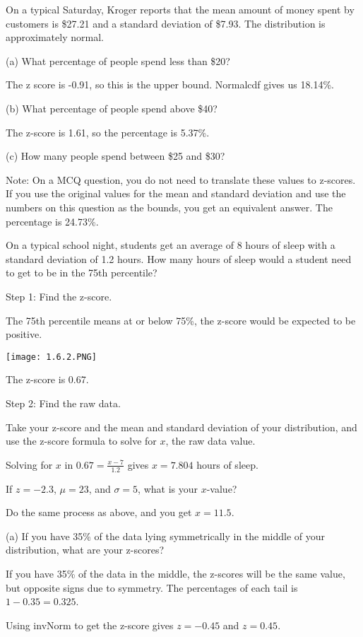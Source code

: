 \documentclass[../stats.tex]{subfiles}
\begin{document}
\begin{example}
    On a typical Saturday, Kroger reports that the mean amount of money spent by customers is \$27.21 and a standard deviation of \$7.93. The distribution is approximately normal.

    (a) What percentage of people spend less than \$20?

    The z score is -0.91, so this is the upper bound. Normalcdf gives us 18.14\%.

    (b) What percentage of people spend above \$40?

    The z-score is 1.61, so the percentage is 5.37\%.

    (c) How many people spend between \$25 and \$30?

    Note: On a MCQ question, you do not need to translate these values to z-scores. If you use the original values for the mean and standard deviation and use the numbers on this question as the bounds, you get an equivalent answer. The percentage is 24.73\%.
\end{example}

\begin{example}
    On a typical school night, students get an average of 8 hours of sleep with a standard deviation of 1.2 hours. How many hours of sleep would a student need to get to be in the 75th percentile?

    Step 1: Find the z-score.

    The 75th percentile means at or below 75\%, the z-score would be expected to be positive.
    \begin{center}
        \texttt{[image: 1.6.2.PNG]}
    \end{center}
    The z-score is 0.67.

    Step 2: Find the raw data.

    Take your z-score and the mean and standard deviation of your distribution, and use the z-score formula to solve for $x$, the raw data value.

    Solving for $x$ in $0.67=\frac{x-7}{1.2}$ gives $x=7.804$ hours of sleep.
\end{example}

\begin{example}
    If $z=-2.3$, $\mu=23$, and $\sigma = 5$, what is your $x$-value?

    Do the same process as above, and you get $x=11.5$.
\end{example}

\begin{example}
    (a) If you have 35\% of the data lying symmetrically in the middle of your distribution, what are your z-scores?

    If you have 35\% of the data in the middle, the z-scores will be the same value, but opposite signs due to symmetry. The percentages of each tail is $1-0.35=0.325$.

    Using invNorm to get the z-score gives $z=-0.45$ and $z=0.45$.
\end{example}
\end{document}
